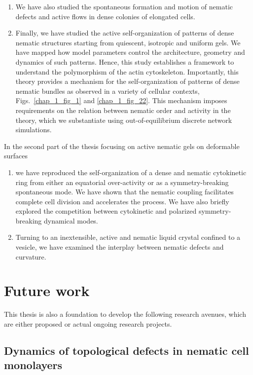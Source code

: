\begin{enumerate}
\begin{enumerate}
	\item We have also studied the spontaneous formation and motion of nematic defects and active flows in dense colonies of elongated cells. 
	\item Finally, we have studied the active self-organization of patterns of dense nematic structures starting from quiescent, isotropic and uniform gels. We have mapped how model parameters control the architecture, geometry and dynamics of such patterns. Hence, this study establishes a framework to understand the polymorphism of the actin cytoskeleton. Importantly, this theory provides a mechanism for the self-organization of patterns of dense nematic bundles as observed in a variety of cellular contexts, Figs.~\ref{chap_1_fig_1} and \ref{chap_1_fig_22}. This mechanism imposes requirements on the relation between nematic order and activity in the theory, which we substantiate using out-of-equilibrium discrete network simulations.
	\end{enumerate}
	In the second part of the thesis focusing on active nematic gels on deformable surfaces
	\begin{enumerate}
	\item we have reproduced the self-organization of a dense and nematic cytokinetic ring from either an equatorial over-activity or as a symmetry-breaking spontaneous mode. We have shown that the nematic coupling facilitates complete cell division and accelerates the process. We have also briefly explored the competition between cytokinetic and polarized symmetry-breaking dynamical modes. 
	\item Turning to an inextensible, active and nematic liquid crystal confined to a vesicle, we have examined the interplay between nematic defects and curvature.
	\end{enumerate}
\end{enumerate}

\section{Future work}

This thesis is also a foundation to develop the following research avenues, which are either proposed or actual ongoing research projects.

\subsection*{Dynamics of topological defects in nematic cell monolayers}

